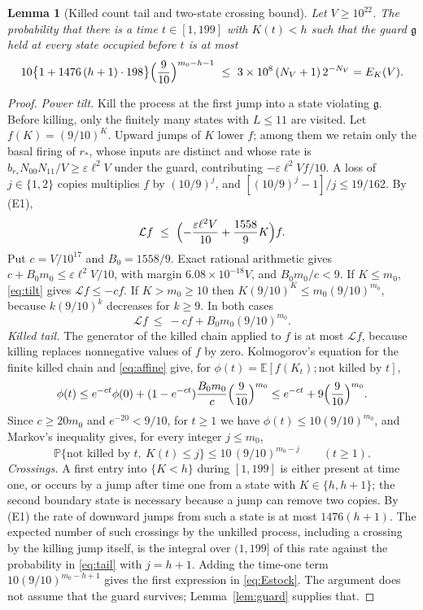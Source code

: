 \documentclass[11pt,letterpaper]{article}
\theoremstyle{plain}
\newtheorem{lemma}[theorem]{Lemma}
\theoremstyle{definition}
\theoremstyle{remark}
\numberwithin{equation}{section}
\newcommand{\PP}{\mathbb P}
\newcommand{\EE}{\mathbb E}
\newcommand{\cL}{\mathcal L}
\newcommand{\eps}{\varepsilon}
\begin{document}
\begin{lemma}[Killed count tail and two-state crossing bound]\label{lem:floor}
Let $V\ge10^{22}$. The probability that there is a time $t\in[1,199]$ with $K(t)<h$ such that the guard $\mathfrak g$ held at every state occupied before $t$ is at most
\begin{equation}\label{eq:Estock}
 10\bigl\{1+1476\,(h+1)\cdot198\bigr\}\Bigl(\frac9{10}\Bigr)^{m_0-h-1}\ \le\ 3\times10^8\,(N_V+1)\,2^{-N_V}=E_K(V).
\end{equation}
\end{lemma}
\begin{proof}
\emph{Power tilt.} Kill the process at the first jump into a state violating $\mathfrak g$. Before killing, only the finitely many states with $L\le11$ are visited. Let $f(K)=(9/10)^K$. Upward jumps of $K$ lower $f$; among them we retain only the basal firing of $r_*$, whose inputs are distinct and whose rate is $b_{r_*}N_{00}N_{11}/V\ge\eps\ell^2V$ under the guard, contributing $-\eps\ell^2Vf/10$. A loss of $j\in\{1,2\}$ copies multiplies $f$ by $(10/9)^j$, and $[(10/9)^j-1]/j\le19/162$. By (E1),
\begin{equation}\label{eq:tilt}
 \cL f\ \le\ \Bigl(-\frac{\eps\ell^2V}{10}+\frac{1558}9K\Bigr)f .
\end{equation}
Put $c=V/10^{17}$ and $B_0=1558/9$. Exact rational arithmetic gives $c+B_0m_0\le\eps\ell^2V/10$, with margin $6.08\times10^{-18}V$, and $B_0m_0/c<9$. If $K\le m_0$, \eqref{eq:tilt} gives $\cL f\le-cf$. If $K>m_0\ge10$ then $K(9/10)^K\le m_0(9/10)^{m_0}$, because $k(9/10)^k$ decreases for $k\ge9$. In both cases
\begin{equation}\label{eq:affine}
 \cL f\ \le\ -cf+B_0m_0(9/10)^{m_0} .
\end{equation}
\emph{Killed tail.} The generator of the killed chain applied to $f$ is at most $\cL f$, because killing replaces nonnegative values of $f$ by zero. Kolmogorov's equation for the finite killed chain and \eqref{eq:affine} give, for $\phi(t)=\EE[f(K_t);\text{not killed by }t]$,
\[
 \phi(t)\le e^{-ct}\phi(0)+(1-e^{-ct})\frac{B_0m_0}c\Bigl(\frac9{10}\Bigr)^{m_0}\le e^{-ct}+9\Bigl(\frac9{10}\Bigr)^{m_0}.
\]
Since $c\ge20m_0$ and $e^{-20}<9/10$, for $t\ge1$ we have $\phi(t)\le10(9/10)^{m_0}$, and Markov's inequality gives, for every integer $j\le m_0$,
\begin{equation}\label{eq:tail}
 \PP\{\text{not killed by }t,\ K(t)\le j\}\le10\,(9/10)^{m_0-j}\qquad(t\ge1).
\end{equation}
\emph{Crossings.} A first entry into $\{K<h\}$ during $[1,199]$ is either present at time one, or occurs by a jump after time one from a state with $K\in\{h,h+1\}$; the second boundary state is necessary because a jump can remove two copies. By (E1) the rate of downward jumps from such a state is at most $1476(h+1)$. The expected number of such crossings by the unkilled process, including a crossing by the killing jump itself, is the integral over $(1,199]$ of this rate against the probability in \eqref{eq:tail} with $j=h+1$. Adding the time-one term $10(9/10)^{m_0-h+1}$ gives the first expression in \eqref{eq:Estock}. The argument does not assume that the guard survives; Lemma~\ref{lem:guard} supplies that.


\end{proof}
\end{document}

